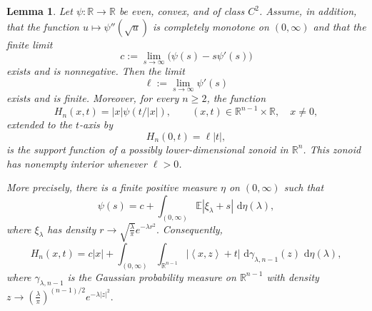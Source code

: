 \documentclass[11pt]{article}
\newtheorem{lemma}[theorem]{Lemma}
\theoremstyle{definition}
\theoremstyle{remark}
\newcommand{\R}{\mathbb R}
\newcommand{\dd}{\,\mathrm d}
\newcommand{\E}{\mathbb E}
\newcommand{\abs}[1]{\left|#1\right|}
\newcommand{\ip}[2]{\left\langle #1,#2\right\rangle}
\begin{document}
\begin{lemma}\label{lem:Gaussian-mixture}
Let $\psi:\R\to\R$ be even, convex, and of class $C^2$.  Assume, in
addition, that the function $u\longmapsto\psi''(\sqrt{u})$
is completely monotone  on $(0,\infty)$ and that the finite limit
\begin{equation}\label{eq:mixture-intercept}
 c:=\lim_{s\to\infty}\bigl(\psi(s)-s\psi'(s)\bigr)
\end{equation}
exists and is nonnegative. Then the limit
\[
 \ell:=\lim_{s\to\infty}\psi'(s)
\]
exists and is finite.  Moreover, for every $n\geq2$, the  function
\begin{equation}\label{eq:Hn-profile}
 H_n(x,t)=\abs{x}\psi(t/\abs{x}),
 \qquad (x,t)\in\R^{n-1}\times\R,\quad x\neq0,
\end{equation}
extended to the $t$-axis by
\[
 H_n(0,t)=\ell\abs{t},
\]
is the support function of a possibly lower-dimensional zonoid in
$\R^n$.  This zonoid has nonempty interior whenever $\ell>0$.

More precisely, there is a finite positive measure $\eta$ on
$(0,\infty)$ such that
\begin{equation}\label{eq:psi-Gaussian-mixture}
\psi(s)=c+\int_{(0,\infty)}\E\abs{\xi_\lambda+s}
 \,\dd\eta(\lambda),
\end{equation}
 where $\xi_\lambda$ has density
$
r\to\sqrt{\frac\lambda\pi}e^{-\lambda r^2}.
$
Consequently,
\begin{equation}\label{eq:Hn-zonoid-representation}
 H_n(x,t)
 =c\abs{x}
 +\int_{(0,\infty)}\int_{\R^{n-1}}
 \abs{\ip{x}{z}+t}\,
 \dd\gamma_{\lambda,n-1}(z)\,\dd\eta(\lambda),
\end{equation}
 where $\gamma_{\lambda,n-1}$ is  the  Gaussian probability measure
on $\R^{n-1}$ with density
$z\to
 \left(\frac\lambda\pi\right)^{(n-1)/2}e^{-\lambda\abs{z}^2}.
$
\end{lemma}
\end{document}

